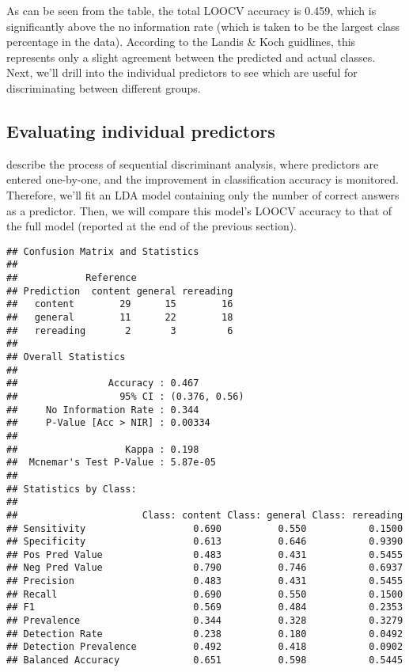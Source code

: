\documentclass[11pt,]{article}
\begin{document}
As can be seen from the table, the total LOOCV accuracy is 0.459, which
is significantly above the no information rate (which is taken to be the
largest class percentage in the data). According to the Landis \& Koch
\citep[1977; as reported in][]{salkindEncyclopediaMeasurementStatistics2007}
guidlines, this represents only a slight agreement between the predicted
and actual classes. Next, we'll drill into the individual predictors to
see which are useful for discriminating between different groups.

\hypertarget{evaluating-individual-predictors}{%
\subsection{Evaluating individual
predictors}\label{evaluating-individual-predictors}}

\citet{tabachnickUsingMultivariateStatistics2012} describe the process
of sequential discriminant analysis, where predictors are entered
one-by-one, and the improvement in classification accuracy is monitored.
Therefore, we'll fit an LDA model containing only the number of correct
answers as a predictor. Then, we will compare this model's LOOCV
accuracy to that of the full model (reported at the end of the previous
section).

\begin{verbatim}
## Confusion Matrix and Statistics
## 
##            Reference
## Prediction  content general rereading
##   content        29      15        16
##   general        11      22        18
##   rereading       2       3         6
## 
## Overall Statistics
##                                        
##                Accuracy : 0.467        
##                  95% CI : (0.376, 0.56)
##     No Information Rate : 0.344        
##     P-Value [Acc > NIR] : 0.00334      
##                                        
##                   Kappa : 0.198        
##  Mcnemar's Test P-Value : 5.87e-05     
## 
## Statistics by Class:
## 
##                      Class: content Class: general Class: rereading
## Sensitivity                   0.690          0.550           0.1500
## Specificity                   0.613          0.646           0.9390
## Pos Pred Value                0.483          0.431           0.5455
## Neg Pred Value                0.790          0.746           0.6937
## Precision                     0.483          0.431           0.5455
## Recall                        0.690          0.550           0.1500
## F1                            0.569          0.484           0.2353
## Prevalence                    0.344          0.328           0.3279
## Detection Rate                0.238          0.180           0.0492
## Detection Prevalence          0.492          0.418           0.0902
## Balanced Accuracy             0.651          0.598           0.5445
\end{verbatim}
\end{document}
